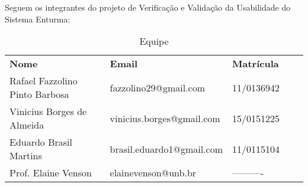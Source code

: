 
Seguem os integrantes do projeto de Verificação e Validação da Usabilidade do Sistema Enturma:

\begin{table}[!ht]
	\centering
	\label{equipe}
	\begin{tabular}{|l|l|l|ll}
		\cline{1-3}
		{\bf Nome}                     & {\bf Email}               & {\bf Matrícula} &  &  \\ \cline{1-3}
		Rafael Fazzolino Pinto Barbosa & fazzolino29@gmail.com     & 11/0136942      &  &  \\ \cline{1-3}
		Vinicius Borges de Almeida     & vinicius.borges@gmail.com & 15/0151225      &  &  \\ \cline{1-3}
		Eduardo Brasil Martins         & brasil.eduardo1@gmail.com & 11/0115104      &  &  \\ \cline{1-3}
		Prof. Elaine Venson            & elainevenson@unb.br       & ----------      &  &  \\ \cline{1-3}
	\end{tabular}
	\caption{Equipe}
\end{table}